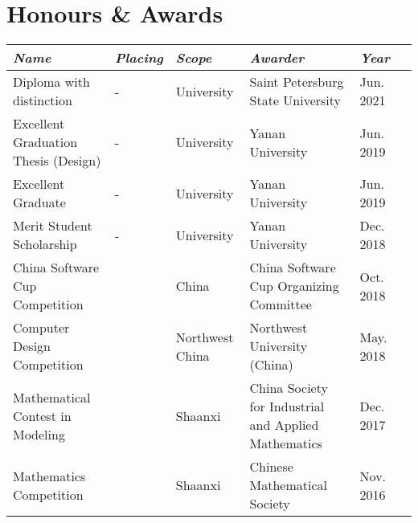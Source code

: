 \documentclass[letterpaper,10pt]{article}
\newcommand{\awardsTable}[1]{
	\begin{tabularx}{\textwidth}{llllll}
	\emph{Name}	& \emph{Placing}	& \emph{Scope}	& \emph{Awarder} & \emph{Year}       \\
	\midrule\midrule
	#1
	\end{tabularx}
}
\newcommand{\awardsTableRow}[6]{
	\BeginAccSupp{method=plain, ActualText=11\string\t 21}#1 & #2 & #3 & #4 & #5\EndAccSupp{} \\
}
\begin{document}
\section{Honours \& Awards}
\setlength{\tabcolsep}{6.0pt}
\renewcommand{\arraystretch}{1.1}
\fontsize{8.5}{11}\selectfont
\awardsTable{
  \awardsTableRow{Diploma with distinction}{-}{University}{Saint Petersburg State University}{Jun. 2021} \\
  \awardsTableRow{Excellent Graduation Thesis (Design)}{-}{University}{Yanan University}{Jun. 2019} \\
  \awardsTableRow{Excellent Graduate}{-}{University}{Yanan University}{Jun. 2019} \\
  \awardsTableRow{Merit Student Scholarship}{-}{University}{Yanan University}{Dec. 2018} \\
  \awardsTableRow{China Software Cup Competition}{\nth{3}}{China}{China Software Cup Organizing Committee}{Oct. 2018} \\
  \awardsTableRow{Computer Design Competition}{\nth{3}}{Northwest China}{Northwest University (China)}{May. 2018} \\
  \awardsTableRow{Mathematical Contest in Modeling}{\nth{2}}{Shaanxi}{China Society for Industrial and Applied Mathematics}{Dec. 2017} \\
  \awardsTableRow{Mathematics Competition}{\nth{3}}{Shaanxi}{Chinese Mathematical Society}{Nov. 2016} \\ \hline
}
\end{document}
